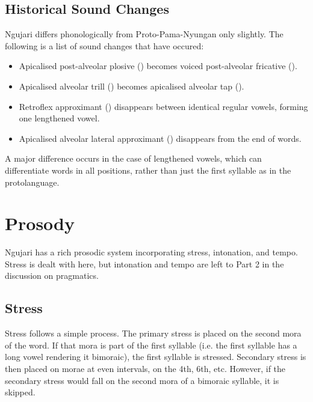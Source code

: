 \subsection{Historical Sound Changes}

Ngujari differs phonologically from Proto-Pama-Nyungan only slightly. The
following is a list of sound changes that have occured:

\begin{itemize}
\item Apicalised post-alveolar plosive () becomes
  voiced post-alveolar fricative ().
\item Apicalised alveolar trill (\textipa{\|]r}) becomes apicalised alveolar tap
  (\textipa{\|]R}).
\item Retroflex approximant (\textipa{\textturnrrtail}) disappears between
  identical regular vowels, forming one lengthened vowel.
\item Apicalised alveolar lateral approximant (\textipa{\|]l}) disappears from
  the end of words.
\end{itemize}

A major difference occurs in the case of lengthened vowels, which can
differentiate words in all positions, rather than just the first syllable as in
the protolanguage.

\section{Prosody}\label{prosody}

Ngujari has a rich prosodic system incorporating stress, intonation, and tempo.
Stress is dealt with here, but intonation and tempo are left to Part 2 in the
discussion on pragmatics.

\subsection{Stress}
Stress follows a simple process. The primary stress is placed on the second mora
of the word. If that mora is part of the first syllable (i.e. the first syllable
has a long vowel rendering it bimoraic), the first syllable is stressed.
Secondary stress is then placed on morae at even intervals, on the 4th, 6th,
etc. However, if the secondary stress would fall on the second mora of a
bimoraic syllable, it is skipped.
